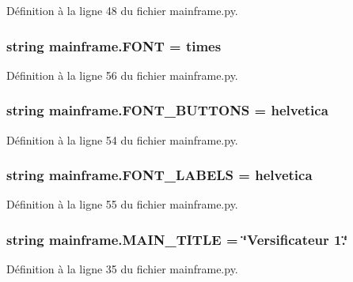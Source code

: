Définition à la ligne 48 du fichier mainframe.\+py.

\hypertarget{namespacemainframe_a23e006e8b339f73b0a6905fac5b37603}{}
\subsubsection[{F\+O\+N\+T}]{\setlength{\rightskip}{0pt plus 5cm}string mainframe.\+F\+O\+N\+T = \textquotesingle{}times\textquotesingle{}}\label{namespacemainframe_a23e006e8b339f73b0a6905fac5b37603}


Définition à la ligne 56 du fichier mainframe.\+py.

\hypertarget{namespacemainframe_a06aedc2b7ca974cea0d0ba091f72e813}{}
\subsubsection[{F\+O\+N\+T\+\_\+\+B\+U\+T\+T\+O\+N\+S}]{\setlength{\rightskip}{0pt plus 5cm}string mainframe.\+F\+O\+N\+T\+\_\+\+B\+U\+T\+T\+O\+N\+S = \textquotesingle{}helvetica\textquotesingle{}}\label{namespacemainframe_a06aedc2b7ca974cea0d0ba091f72e813}


Définition à la ligne 54 du fichier mainframe.\+py.

\hypertarget{namespacemainframe_acfc1a2e7db046b191dd8b784c4314f3b}{}
\subsubsection[{F\+O\+N\+T\+\_\+\+L\+A\+B\+E\+L\+S}]{\setlength{\rightskip}{0pt plus 5cm}string mainframe.\+F\+O\+N\+T\+\_\+\+L\+A\+B\+E\+L\+S = \textquotesingle{}helvetica\textquotesingle{}}\label{namespacemainframe_acfc1a2e7db046b191dd8b784c4314f3b}


Définition à la ligne 55 du fichier mainframe.\+py.

\hypertarget{namespacemainframe_a4d151f87ec600e83da16f6301c0207e3}{}
\subsubsection[{M\+A\+I\+N\+\_\+\+T\+I\+T\+L\+E}]{\setlength{\rightskip}{0pt plus 5cm}string mainframe.\+M\+A\+I\+N\+\_\+\+T\+I\+T\+L\+E = \char`\"{}Versificateur 1.\char`\"{}}\label{namespacemainframe_a4d151f87ec600e83da16f6301c0207e3}


Définition à la ligne 35 du fichier mainframe.\+py.

